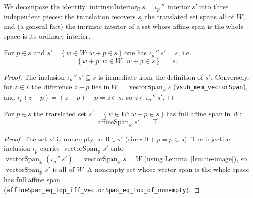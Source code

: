 We decompose the identity $\operatorname{intrinsicInterior}_{\mathbb R} s =
\iota_p\,''\,\operatorname{interior} s'$ into three independent pieces: the
translation recovers $s$, the translated set spans all of $W$, and (a general
fact) the intrinsic interior of a set whose affine span is the whole space is its
ordinary interior.

\begin{lemma}
    \label{lem:iie-image}
    \leanok
    For $p \in s$ and $s' = \{\, w \in W : w + p \in s \,\}$ one has
    $\iota_p\,''\,s' = s$, i.e.
    \[
        \{\, w + p : w \in W,\ w + p \in s \,\} \;=\; s .
    \]
\end{lemma}
\begin{proof}
    The inclusion $\iota_p\,''\,s' \subseteq s$ is immediate from the definition of
    $s'$. Conversely, for $z \in s$ the difference $z - p$ lies in
    $W = \operatorname{vectorSpan}_{\mathbb R} s$
    (\texttt{vsub\_mem\_vectorSpan}), and $\iota_p(z - p) = (z - p) + p = z \in s$,
    so $z \in \iota_p\,''\,s'$.
\end{proof}

\begin{lemma}
    \label{lem:iie-affinespan-top}
    \leanok
    For $p \in s$ the translated set $s' = \{\, w \in W : w + p \in s \,\}$ has full
    affine span in $W$:
    \[
        \operatorname{affineSpan}_{\mathbb R} s' \;=\; \top .
    \]
\end{lemma}
\begin{proof}
    The set $s'$ is nonempty, as $0 \in s'$ (since $0 + p = p \in s$). The
    injective inclusion $\iota_p$ carries $\operatorname{vectorSpan}_{\mathbb R} s'$
    onto $\operatorname{vectorSpan}_{\mathbb R}(\iota_p\,''\,s')
    = \operatorname{vectorSpan}_{\mathbb R} s = W$ (using
    Lemma~\ref{lem:iie-image}), so $\operatorname{vectorSpan}_{\mathbb R} s'$ is all
    of $W$. A nonempty set whose vector span is the whole space has full affine
    span (\texttt{affineSpan\_eq\_top\_iff\_vectorSpan\_eq\_top\_of\_nonempty}).
\end{proof}

